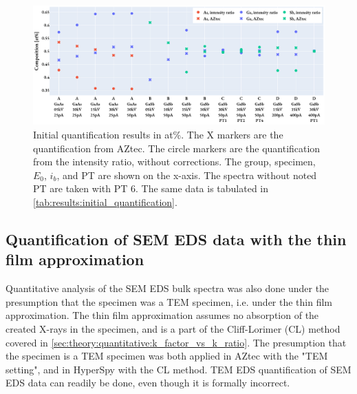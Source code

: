 



\begin{figure}[htbp]
    \centering
    \includegraphics[width=0.99\linewidth]{figures/results/initial_quantification.pdf}
    \caption{
        Initial quantification results in at\%.
        The X markers are the quantification from AZtec.
        The circle markers are the quantification from the intensity ratio, without corrections.
        The group, specimen, $E_0$, $i_b$, and PT are shown on the x-axis.
        The spectra without noted PT are taken with PT 6.
        The same data is tabulated in \cref{tab:results:initial_quantification}.
    }
    \label{fig:results:initial_quantification}
\end{figure}








\subsection{Quantification of SEM EDS data with the thin film approximation}
\label{sec:results:quantification_cliff_lorimer}


Quantitative analysis of the SEM EDS bulk spectra was also done under the presumption that the specimen was a TEM specimen, i.e. under the thin film approximation.
The thin film approximation assumes no absorption of the created X-rays in the specimen, and is a part of the Cliff-Lorimer (CL) method covered in \cref{sec:theory:quantitative:k_factor_vs_k_ratio}.
The presumption that the specimen is a TEM specimen was both applied in AZtec with the "TEM setting", and in HyperSpy with the CL method.
TEM EDS quantification of SEM EDS data can readily be done, even though it is formally incorrect.

